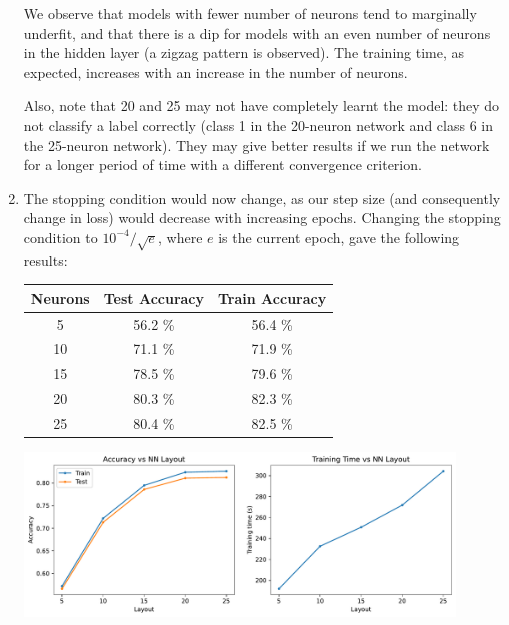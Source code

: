 \documentclass[12pt]{article}
\begin{document}
\begin{enumerate}[label=(\alph*)]
    We observe that models with fewer number of neurons tend to marginally 
    underfit, and that there is a dip for models with an even number of neurons 
    in the hidden layer (a zigzag pattern is observed). The training time, 
    as expected, increases with an increase in the number of neurons. 

    Also, note that 20 and 25 may not have completely learnt the model: they 
    do not classify a label correctly (class 1 in the 20-neuron network and class 
    6 in the 25-neuron network). They may give better results if we run the 
    network for a longer period of time with a different convergence criterion.

    \item The stopping condition would now change, as our step size (and consequently
    change in loss) would decrease with increasing epochs. Changing the stopping
    condition to $10^{-4}/\sqrt{e}$, where $e$ is the current epoch, gave the 
    following results:
    \begin{center}
        \begin{tabular}{|c|c|c|}
            \hline
            Neurons & Test Accuracy & Train Accuracy \\ 
            \hline 
            5  & 56.2 \% & 56.4 \% \\
            10 & 71.1 \% & 71.9 \% \\
            15 & 78.5 \% & 79.6 \% \\
            20 & 80.3 \% & 82.3 \% \\
            25 & 80.4 \% & 82.5 \% \\
            \hline
        \end{tabular}
    \end{center}

   \begin{center}
        \includegraphics[width=0.9\textwidth]{../Q2/single_layer_sigmoid_epochlr/acc_time.pdf}
    \end{center}


\end{enumerate}
\end{document}

